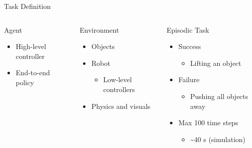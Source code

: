 \begin{frame}{Task Definition}{}
    \begin{columns}%
        \begin{column}{0.32\textwidth}%
            \begin{block}{Agent}
                \begin{itemize}
                    \item High-level controller
                    \item End-to-end policy
                \end{itemize}
            \end{block}
        \end{column}
        \begin{column}{0.32\textwidth}%
            \begin{block}{Environment}
                \begin{itemize}
                    \item Objects
                    \item Robot
                    \begin{itemize}
                        \item Low-level controllers
                    \end{itemize}
                    \item Physics and visuals
                \end{itemize}
            \end{block}
        \end{column}
        \begin{column}{0.35\textwidth}%
            \begin{block}{Episodic Task}
                \begin{itemize}
                    \item Success
                    \begin{itemize}
                        \item Lifting an object
                    \end{itemize}
                    \item Failure
                    \begin{itemize}
                        \item Pushing all objects away
                    \end{itemize}
                    \item Max 100 time steps
                    \begin{itemize}
                        \item \textasciitilde 40 s (simulation)
                    \end{itemize}
                \end{itemize}
            \end{block}
        \end{column}
    \end{columns}
\end{frame}

